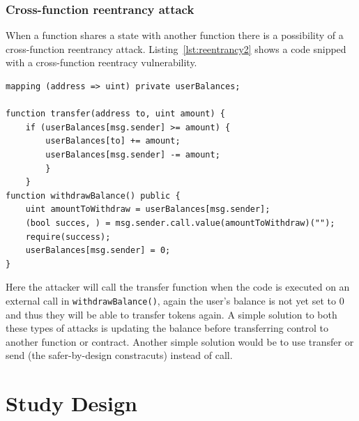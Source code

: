 \documentclass[10pt,conference]{IEEEtran}
\begin{document}
\subsubsection{Cross-function reentrancy attack}
When a function shares a state with another function there is a possibility of a cross-function reentrancy attack.  Listing~\ref{lst:reentrancy2}  shows a code snipped with a cross-function reentracy vulnerability. 
\begin{lstlisting}[language=Solidity, caption=Cross-function reentrancy attack, label=lst:reentrancy2]
mapping (address => uint) private userBalances;

function transfer(address to, uint amount) {
    if (userBalances[msg.sender] >= amount) {
        userBalances[to] += amount;
        userBalances[msg.sender] -= amount;
        }
    }
function withdrawBalance() public {
    uint amountToWithdraw = userBalances[msg.sender];
    (bool succes, ) = msg.sender.call.value(amountToWithdraw)("");
    require(success);
    userBalances[msg.sender] = 0;
}

\end{lstlisting}
Here the attacker will call the transfer function when the code is executed on an external call in \texttt{withdrawBalance()},  again the user's balance is not yet set to 0 and thus they will be able to transfer tokens again. A simple solution to both these types of attacks is updating the balance before transferring control to another function or contract.  Another simple solution would be to use transfer or send (the safer-by-design constracuts) instead of call.



\section{Study Design}
\end{document}
